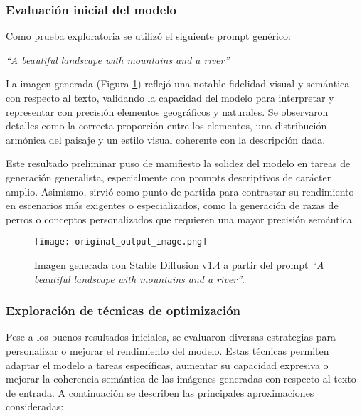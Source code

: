 \subsubsection{Evaluación inicial del modelo}

Como prueba exploratoria se utilizó el siguiente prompt genérico:

\begin{center}
\textit{``A beautiful landscape with mountains and a river''}
\end{center}

La imagen generada (Figura \ref{fig:original_image}) reflejó una notable fidelidad visual y semántica con respecto al texto, validando la capacidad del modelo para interpretar y representar con precisión elementos geográficos y naturales. Se observaron detalles como la correcta proporción entre los elementos, una distribución armónica del paisaje y un estilo visual coherente con la descripción dada.

Este resultado preliminar puso de manifiesto la solidez del modelo en tareas de generación generalista, especialmente con prompts descriptivos de carácter amplio. Asimismo, sirvió como punto de partida para contrastar su rendimiento en escenarios más exigentes o especializados, como la generación de razas de perros o conceptos personalizados que requieren una mayor precisión semántica.

\begin{figure}[H]
\centering
\texttt{[image: original\_output\_image.png]}
\caption{Imagen generada con Stable Diffusion v1.4 a partir del prompt \textit{``A beautiful landscape with mountains and a river''}.}
\label{fig:original_image}
\end{figure}

\subsubsection{Exploración de técnicas de optimización}
Pese a los buenos resultados iniciales, se evaluaron diversas estrategias para personalizar o mejorar el rendimiento del modelo. Estas técnicas permiten adaptar el modelo a tareas específicas, aumentar su capacidad expresiva o mejorar la coherencia semántica de las imágenes generadas con respecto al texto de entrada. A continuación se describen las principales aproximaciones consideradas:

